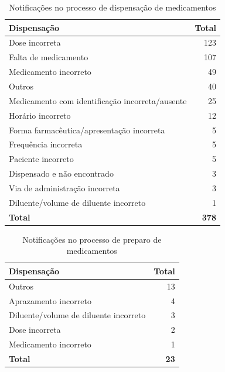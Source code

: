\documentclass[
  a4paper]{article}
\begin{document}
\begin{table}[H]

\caption{\label{tab:unnamed-chunk-36}Notificações no processo de dispensação de medicamentos}
\centering
\begin{tabular}[t]{lr}
\toprule
Dispensação & Total\\
\midrule
Dose incorreta & 123\\
Falta de medicamento & 107\\
Medicamento incorreto & 49\\
Outros & 40\\
Medicamento com identificação incorreta/ausente & 25\\
\addlinespace
Horário incorreto & 12\\
Forma farmacêutica/apresentação incorreta & 5\\
Frequência incorreta & 5\\
Paciente incorreto & 5\\
Dispensado e não encontrado & 3\\
\addlinespace
Via de administração incorreta & 3\\
Diluente/volume de diluente incorreto & 1\\
\midrule
\textbf{Total} & \textbf{378}\\
\bottomrule
\end{tabular}
\end{table}

\begin{table}[H]

\caption{\label{tab:unnamed-chunk-37}Notificações no processo de preparo de medicamentos}
\centering
\begin{tabular}[t]{lr}
\toprule
Dispensação & Total\\
\midrule
Outros & 13\\
Aprazamento incorreto & 4\\
Diluente/volume de diluente incorreto & 3\\
Dose incorreta & 2\\
Medicamento incorreto & 1\\
\midrule
\addlinespace
\textbf{Total} & \textbf{23}\\
\bottomrule
\end{tabular}
\end{table}
\end{document}
